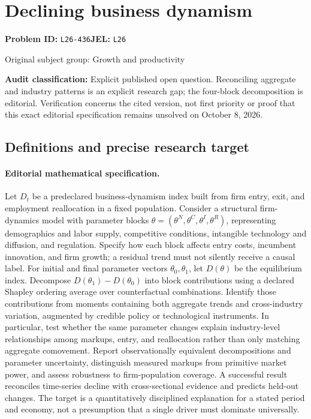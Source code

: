 \documentclass[11pt,a4paper]{article}
\begin{document}
\section*{Declining business dynamism}
\textbf{Problem ID:} \texttt{L26-436}\quad \textbf{JEL:} \texttt{L26}\par
\label{problem:OP-0265}
{\sffamily\small\color{muted}Original subject group: Growth and productivity\par}
\label{definitions:problem:30007546}
\textbf{Audit classification:} Explicit published open question. Reconciling aggregate and industry patterns is an explicit research gap; the four-block decomposition is editorial. Verification concerns the cited version, not first priority or proof that this exact editorial specification remains unsolved on October 8, 2026.
\subsection*{Definitions and precise research target}
\paragraph{Editorial mathematical specification.} Let \(D_t\) be a predeclared business-dynamism index built from firm entry, exit, and employment reallocation in a fixed population. Consider a structural firm-dynamics model with parameter blocks \(\theta=(\theta^N,\theta^C,\theta^I,\theta^R)\), representing demographics and labor supply, competitive conditions, intangible technology and diffusion, and regulation. Specify how each block affects entry costs, incumbent innovation, and firm growth; a residual trend must not silently receive a causal label.
For initial and final parameter vectors \(\theta_0,\theta_1\), let \(D(\theta)\) be the equilibrium index. Decompose \(D(\theta_1)-D(\theta_0)\) into block contributions using a declared Shapley ordering average over counterfactual combinations. Identify those contributions from moments containing both aggregate trends and cross-industry variation, augmented by credible policy or technological instruments. In particular, test whether the same parameter changes explain industry-level relationships among markups, entry, and reallocation rather than only matching aggregate comovement.
Report observationally equivalent decompositions and parameter uncertainty, distinguish measured markups from primitive market power, and assess robustness to firm-population coverage. A successful result reconciles time-series decline with cross-sectional evidence and predicts held-out changes. The target is a quantitatively disciplined explanation for a stated period and economy, not a presumption that a single driver must dominate universally.
\end{document}
